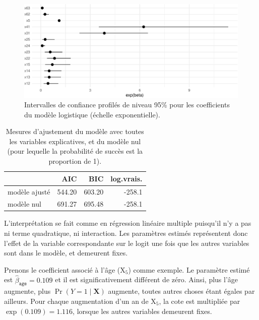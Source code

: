 \documentclass[
  11pt,
  letterpaper,
]{book}
\theoremstyle{definition}
\theoremstyle{remark}
\begin{document}
\begin{figure}[ht!]

{\centering \includegraphics[width=1\textwidth,height=\textheight]{./05-reglogistique_files/figure-pdf/fig-confint-modele2-logist-1.pdf}

}

\caption{\label{fig-confint-modele2-logist}Intervalles de confiance
profilés de niveau 95\% pour les coefficients du modèle logistique
(échelle exponentielle).}

\end{figure}

\hypertarget{tbl-gof-logist1}{}
\begin{table}
\caption{\label{tbl-gof-logist1}Mesures d'ajustement du modèle avec toutes les variables explicatives,
et du modèle nul (pour lequelle la probabilité de succès est la
proportion de 1). }\tabularnewline

\centering
\begin{tabular}{lrrr}
\toprule
  & AIC & BIC & log.vrais.\\
\midrule
modèle ajusté & 544.20 & 603.20 & -258.1\\
modèle nul & 691.27 & 695.48 & -258.1\\
\bottomrule
\end{tabular}
\end{table}

L'interprétation se fait comme en régression linéaire multiple puisqu'il
n'y a pas ni terme quadratique, ni interaction. Les paramètres estimés
représentent donc l'effet de la variable correspondante sur le logit une
fois que les autres variables sont dans le modèle, et demeurent fixes.

Prenons le coefficient associé à l'âge (\(\mathrm{X}_5\)) comme exemple.
Le paramètre estimé est \(\widehat{\beta}_{\texttt{age}}=0.109\) et il
est significativement différent de zéro. Ainsi, plus l'âge augmente,
plus \(\Pr(Y=1\mid \mathbf{X})\) augmente, toutes autres choses étant
égales par ailleurs. Pour chaque augmentation d'un an de
\(\mathrm{X}_5\), la cote est multipliée par \(\exp(0.109)=1.116\),
lorsque les autres variables demeurent fixes.
\end{document}
